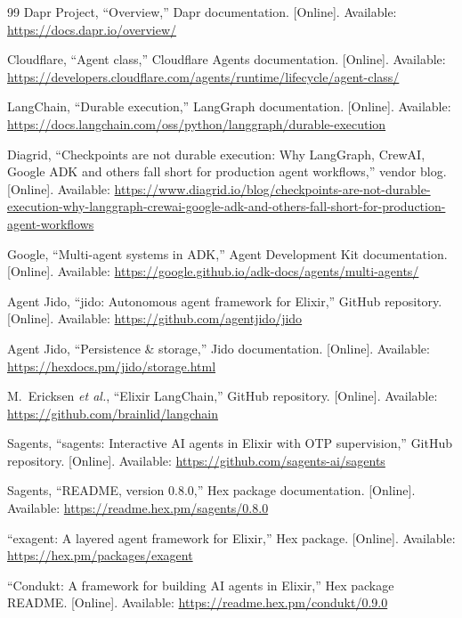 \documentclass[conference,letterpaper]{IEEEtran}
\begin{document}
\begin{thebibliography}{99}
Dapr Project, ``Overview,'' Dapr documentation. [Online]. Available:
\url{https://docs.dapr.io/overview/}

Cloudflare, ``Agent class,'' Cloudflare Agents documentation. [Online].
Available:
\url{https://developers.cloudflare.com/agents/runtime/lifecycle/agent-class/}

LangChain, ``Durable execution,'' LangGraph documentation. [Online].
Available: \url{https://docs.langchain.com/oss/python/langgraph/durable-execution}

Diagrid, ``Checkpoints are not durable execution: Why LangGraph, CrewAI,
Google ADK and others fall short for production agent workflows,'' vendor
blog. [Online]. Available:
\url{https://www.diagrid.io/blog/checkpoints-are-not-durable-execution-why-langgraph-crewai-google-adk-and-others-fall-short-for-production-agent-workflows}

Google, ``Multi-agent systems in ADK,'' Agent Development Kit documentation.
[Online]. Available: \url{https://google.github.io/adk-docs/agents/multi-agents/}

Agent Jido, ``jido: Autonomous agent framework for Elixir,'' GitHub
repository. [Online]. Available: \url{https://github.com/agentjido/jido}

Agent Jido, ``Persistence \& storage,'' Jido documentation. [Online].
Available: \url{https://hexdocs.pm/jido/storage.html}

M.~Ericksen \emph{et al.}, ``Elixir LangChain,'' GitHub repository.
[Online]. Available: \url{https://github.com/brainlid/langchain}

Sagents, ``sagents: Interactive AI agents in Elixir with OTP supervision,''
GitHub repository. [Online]. Available:
\url{https://github.com/sagents-ai/sagents}

Sagents, ``README, version 0.8.0,'' Hex package documentation. [Online].
Available: \url{https://readme.hex.pm/sagents/0.8.0}

``exagent: A layered agent framework for Elixir,'' Hex package. [Online].
Available: \url{https://hex.pm/packages/exagent}

``Condukt: A framework for building AI agents in Elixir,'' Hex package
README. [Online]. Available: \url{https://readme.hex.pm/condukt/0.9.0}


\end{thebibliography}
\end{document}
